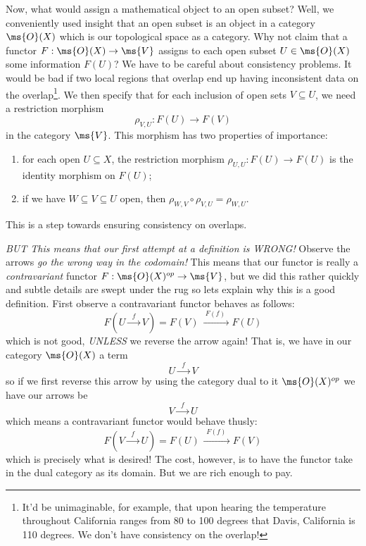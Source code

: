Now, what would assign a mathematical object to an open subset?
Well, we conveniently used insight that an open subset is an
object in a category $\ms{O}(X)$ which is our topological space as a
category. Why not claim that a functor $F:\ms{O}(X)\to\ms{V}$
assigns to each open subset $U\in\ms{O}(X)$ some information $F(U)$?
We have to be careful about consistency problems. It would be bad
if two local regions that overlap end up having inconsistent data
on the overlap\footnote{It'd be unimaginable, for example, that
  upon hearing the temperature throughout California ranges from
  80 to 100 degrees that Davis, California is 110 degrees. We
  don't have consistency on the overlap!}. We then specify that
for each inclusion of open sets $V\subseteq U$, we need a
restriction morphism
\begin{equation}%
\rho_{V,U}:F(U)\to F(V)
\end{equation}
in the category $\ms{V}$. This morphism has two properties of
importance:
\begin{enumerate}
\item for each open $U\subseteq X$, the restriction morphism
  $\rho_{U,U}:F(U)\to F(U)$ is the identity morphism on $F(U)$; 
\item if we have $W\subseteq V\subseteq U$ open, then
  $\rho_{W,V}\circ\rho_{V,U} = \rho_{W,U}$.
\end{enumerate}
This is a step towards ensuring consistency on overlaps.

\emph{BUT This means that our first attempt at a definition is WRONG!} 
Observe the arrows \emph{go the wrong way in the codomain!} This
means that our functor is really a \emph{contravariant} functor
$F:\ms{O}(X)^{op}\to\ms{V}$, but we did this rather quickly and
subtle details are swept under the rug so lets explain why this
is a good definition. First observe a contravariant functor
behaves as follows:
\begin{equation}%
F\left(U\xrightarrow{\;\;f\;\;}V\right) = F(V)\xrightarrow{\;\;F(f)\;\;}F(U)
\end{equation}
which is not good, \emph{UNLESS} we reverse the arrow again! That
is, we have in our category $\ms{O}(X)$ a term
\begin{equation*}%
U\xrightarrow{\;\;f\;\;}V
\end{equation*}
so if we first reverse this arrow by using the category dual to
it $\ms{O}(X)^{op}$ we have our arrows be
\begin{equation*}%
V\xrightarrow{\;\;f\;\;}U
\end{equation*}
which means a contravariant functor would behave thusly:
\begin{equation}%
F\left(V\xrightarrow{\;\;f\;\;}U\right) = F(U)\xrightarrow{\;\;F(f)\;\;}F(V)
\end{equation}
which is precisely what is desired! The cost, however, is to have
the functor take in the dual category as its domain. But we are
rich enough to pay.

